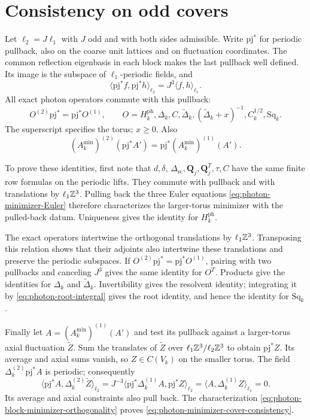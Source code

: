 \section{Consistency on odd covers}
\label{subsec:photon-cover-consistency}

Let $\ell_2=J\ell_1$ with $J$ odd and with both sides admissible.
Write $\mathrm{pj}^*$ for periodic pullback, also on the coarse
unit lattices and on fluctuation coordinates. The common
reflection eigenbasis in each block makes the last pullback
well defined. Its image is the subspace of $\ell_1$-periodic
fields, and
\[
 \langle\mathrm{pj}^*f,\mathrm{pj}^*h\rangle_{\ell_2}
                              =J^3\langle f,h\rangle_{\ell_1}.
\]
All exact photon operators commute with this pullback:
\begin{equation}\label{eq:photon-exact-cover-consistency}
 O^{(2)}\mathrm{pj}^*=\mathrm{pj}^*O^{(1)},
 \qquad
 O=H_k^{\mathrm{ph}},\Delta_k,C,\widetilde\Delta_k,
                (\widetilde\Delta_k+x)^{-1},C_k^{1/2},\mathrm{Sq}_k.
\end{equation}
The superscript specifies the torus; $x\ge0$. Also
\begin{equation}\label{eq:photon-minimizer-cover-consistency}
 (A_k^{\min})^{(2)}(\mathrm{pj}^*A')
                         =\mathrm{pj}^*(A_k^{\min})^{(1)}(A').
\end{equation}

To prove these identities, first note that $d,\delta$,
$\Delta_{\mathrm{sc}},\mathbf Q_j,\mathbf Q_j^T,\tau,C$
have the same finite row formulas on the periodic lifts. They
commute with pullback and with translations by $\ell_1\mathbb Z^3$.
Pulling back the three Euler equations
\eqref{eq:photon-minimizer-Euler} therefore characterizes the
larger-torus minimizer with the pulled-back datum. Uniqueness
gives the identity for $H_k^{\mathrm{ph}}$.

The exact operators intertwine the orthogonal translations by
$\ell_1\mathbb Z^3$. Transposing this relation shows that their adjoints
also intertwine these translations and preserve the periodic subspaces. If
$O^{(2)}\mathrm{pj}^*=\mathrm{pj}^*O^{(1)}$, pairing with two
pullbacks and canceling $J^3$ gives the same identity for $O^T$.
Products give the identities for $\Delta_k$ and
$\widetilde\Delta_k$. Invertibility gives the resolvent identity;
integrating it by \eqref{eq:photon-root-integral} gives the root
identity, and hence the identity for $\mathrm{Sq}_k$.

Finally let $A=(A_k^{\min})^{(1)}(A')$ and test its pullback
against a larger-torus axial fluctuation $\widetilde Z$. Sum the
translates of $\widetilde Z$ over
$\ell_1\mathbb Z^3/\ell_2\mathbb Z^3$ to obtain $\mathrm{pj}^*Z$. Its average
and axial sums vanish, so $Z\in C(V_k)$ on the smaller torus.
The field $\Delta_k^{(2)}\mathrm{pj}^*A$ is periodic; consequently
\[
 \langle\mathrm{pj}^*A,\Delta_k^{(2)}\widetilde Z\rangle_{\ell_2}
  =J^{-3}\langle\mathrm{pj}^*\Delta_k^{(1)}A,
                                         \mathrm{pj}^*Z\rangle_{\ell_2}
  =\langle A,\Delta_k^{(1)}Z\rangle_{\ell_1}=0.
\]
Its average and axial constraints also pull back. The
characterization \eqref{eq:photon-block-minimizer-orthogonality}
proves \eqref{eq:photon-minimizer-cover-consistency}.



